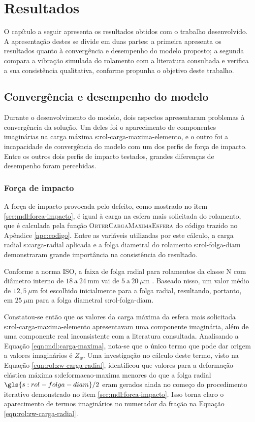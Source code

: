 \documentclass[12pt,oneside,english,brazil,lmodern,siglas,simbolos,cite=num]{ucsmonograph}
\begin{document}
	\chapter{Resultados}
	O capítulo a seguir apresenta os resultados obtidos com o trabalho desenvolvido.
	A apresentação destes se divide em duas partes: a primeira apresenta os resultados quanto à convergência e desempenho do modelo proposto;
	a segunda compara a vibração simulada do rolamento com a literatura consultada e verifica a sua consistência qualitativa, conforme propunha o objetivo deste trabalho.
	
	\section{Convergência e desempenho do modelo}
	Durante o desenvolvimento do modelo, dois aspectos apresentaram problemas à convergência da solução.
	Um deles foi o aparecimento de componentes imaginárias na carga máxima \gls{s:rol-carga-maxima-elemento}, e o outro foi a incapacidade de convergência do modelo com um dos perfis de força de impacto.
	Entre os outros dois perfis de impacto testados, grandes diferenças de desempenho foram percebidas.
	
	\subsection{Força de impacto}
	A força de impacto provocada pelo defeito, como mostrado no item \ref{sec:mdl:forca-impacto}, é igual à carga na esfera mais solicitada do rolamento, que é calculada pela função \textsc{ObterCargaMaximaEsfera} do código trazido no Apêndice \ref{apc:codigo}.
	Entre as variáveis utilizadas por este cálculo, a carga radial \gls{s:carga-radial} aplicada e a folga diametral do rolamento \gls{s:rol-folga-diam} demonstraram grande importância na consistência do resultado.
	
	Conforme a norma ISO, a faixa de folga radial para rolamentos da classe N com diâmetro interno de $18\ \text{a}\ 24\ \text{mm}$ vai de $5\ \text{a}\ 20\ \mu\text{m}$ \cite{skf6004}.
	Baseado nisso, um valor médio de $12,5\ \mu\text{m}$ foi escolhido inicialmente para a folga radial, resultando, portanto, em $25\ \mu\text{m}$ para a folga diametral \gls{s:rol-folga-diam}.
	
	Constatou-se então que os valores da carga máxima da esfera mais solicitada \gls{s:rol-carga-maxima-elemento} apresentavam uma componente imaginária, além de uma componente real inconsistente com a literatura consultada.
	Analisando a Equação \ref{eqn:mdl:carga-maxima}, nota-se que o único termo que pode dar origem a valores imaginários é $Z_w$.
	Uma investigação no cálculo deste termo, visto na Equação \ref{eqn:rol:zw-carga-radial}, identificou que valores para a deformação elástica máxima \gls{s:deformacao-maxima} menores do que a folga radial $\gls{s:rol-folga-diam}/2$ eram gerados ainda no começo do procedimento iterativo demonstrado no item \ref{sec:mdl:forca-impacto}.
	Isso torna claro o aparecimento de termos imaginários no numerador da fração na Equação \ref{eqn:rol:zw-carga-radial}.
	
\end{document}
